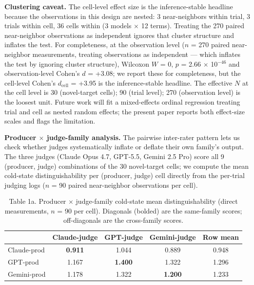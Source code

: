 \documentclass[11pt,a4paper]{article}
\begin{document}
\textbf{Clustering caveat.} The cell-level effect size is the inference-stable headline because the observations in this design are nested: 3 near-neighbors within trial, 3 trials within cell, 36 cells within (3 models $\times$ 12 terms). Treating the 270 paired near-neighbor observations as independent ignores that cluster structure and inflates the test. For completeness, at the observation level ($n$ = 270 paired near-neighbor measurements, treating observations as independent --- which inflates the test by ignoring cluster structure), Wilcoxon $W$ = 0, $p$ = 2.66 $\times$ 10$^{-46}$ and observation-level Cohen's $d$ = +3.08; we report these for completeness, but the cell-level Cohen's $d_{\text{cell}}$ = +3.95 is the inference-stable headline. The effective $N$ at the cell level is 30 (novel-target cells); 90 (trial level); 270 (observation level) is the loosest unit. Future work will fit a mixed-effects ordinal regression treating trial and cell as nested random effects; the present paper reports both effect-size scales and flags the limitation.

\textbf{Producer $\times$ judge-family analysis.} The pairwise inter-rater pattern lets us check whether judges systematically inflate or deflate their own family's output. The three judges (Claude Opus 4.7, GPT-5.5, Gemini 2.5 Pro) score all 9 (producer, judge) combinations of the 30 novel-target cells; we compute the mean cold-state distinguishability per (producer, judge) cell directly from the per-trial judging logs ($n$ = 90 paired near-neighbor observations per cell).

\begin{table}[t]
  \centering
  \footnotesize
  \begin{tabular}{lcccc}
    \toprule
                  & \textbf{Claude-judge} & \textbf{GPT-judge} & \textbf{Gemini-judge} & \textbf{Row mean} \\
    \midrule
    Claude-prod   & \textbf{0.911}    & 1.044     & 0.889        & 0.948    \\
    GPT-prod      & 1.167             & \textbf{1.400} & 1.322   & 1.296    \\
    Gemini-prod   & 1.178             & 1.322     & \textbf{1.200} & 1.233 \\
    \bottomrule
  \end{tabular}
  \caption{Table 1a. Producer $\times$ judge-family cold-state mean distinguishability (direct measurements, $n$ = 90 per cell). Diagonals (bolded) are the same-family scores; off-diagonals are the cross-family scores.}
  \label{tab:producer-judge}
\end{table}
\end{document}
